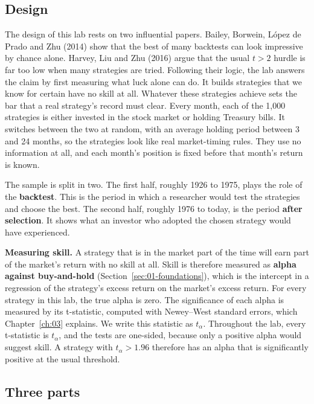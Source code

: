 \subsection*{Design}

The design of this lab rests on two influential papers. Bailey, Borwein, L\'opez de Prado and Zhu (2014) show that the best of many backtests can look impressive by chance alone. Harvey, Liu and Zhu (2016) argue that the usual $t > 2$ hurdle is far too low when many strategies are tried. Following their logic, the lab answers the claim by first measuring what luck alone can do. It builds strategies that we know for certain have no skill at all. Whatever these strategies achieve sets the bar that a real strategy's record must clear. Every month, each of the 1,000 strategies is either invested in the stock market or holding Treasury bills. It switches between the two at random, with an average holding period between 3 and 24 months, so the strategies look like real market-timing rules. They use no information at all, and each month's position is fixed before that month's return is known.

The sample is split in two. The first half, roughly 1926 to 1975, plays the role of the \textbf{backtest}. This is the period in which a researcher would test the strategies and choose the best. The second half, roughly 1976 to today, is the period \textbf{after selection}. It shows what an investor who adopted the chosen strategy would have experienced.

\textbf{Measuring skill.} A strategy that is in the market part of the time will earn part of the market's return with no skill at all. Skill is therefore measured as \textbf{alpha against buy-and-hold} (Section~\ref{sec:01-foundations}), which is the intercept in a regression of the strategy's excess return on the market's excess return. For every strategy in this lab, the true alpha is zero. The significance of each alpha is measured by its t-statistic, computed with Newey--West standard errors, which Chapter~\ref{ch:03} explains. We write this statistic as $t_\alpha$. Throughout the lab, every t-statistic is $t_\alpha$, and the tests are one-sided, because only a positive alpha would suggest skill. A strategy with $t_\alpha > 1.96$ therefore has an alpha that is significantly positive at the usual threshold.

\subsection*{Three parts}

